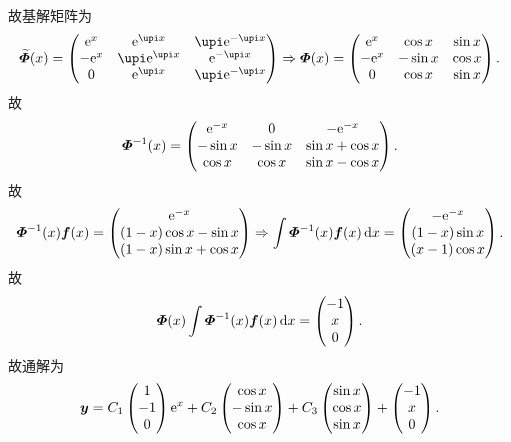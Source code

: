 \begin{solution}
  故基解矩阵为
  \[\widetilde{\bmitPhi}(x) = 
  \begin{pmatrix}
    \e^x&\e^{\upi x}&\upi\e^{-\upi x} \\
    -\e^x&\upi\e^{\upi x}&\e^{-\upi x} \\
    0&\e^{\upi x}&\upi\e^{-\upi x}
  \end{pmatrix}\Rightarrow
  \bmitPhi(x) =
  \begin{pmatrix}
    \e^x&\cos x&\sin x \\
    -\e^x&-\sin x&\cos x \\
    0&\cos x&\sin x
  \end{pmatrix}.\]
  故
  \[\bm{\varPhi}^{-1}(x) =
  \begin{pmatrix}
    \mathrm{e}^{-x}&0&-\mathrm{e}^{-x} \\
    -\sin x&-\sin x&\sin x+\cos x \\
    \cos x&\cos x&\sin x-\cos x
  \end{pmatrix}.\]
  故
  \[\bm{\varPhi}^{-1}(x)\bm{f}(x) =
  \begin{pmatrix}
    \mathrm{e}^{-x} \\
    (1-x)\cos x-\sin x \\
    (1-x)\sin x+\cos x
  \end{pmatrix}\Rightarrow
  \int\bm{\varPhi}^{-1}(x)\bm{f}(x)\mathop{}\!\mathrm{d} x =
  \begin{pmatrix}
    -\mathrm{e}^{-x} \\ 
    (1-x)\sin x \\
    (x-1)\cos x
  \end{pmatrix}.\]
  故
  \[\bm{\varPhi}(x)\int\bm{\varPhi}^{-1}(x)\bm{f}(x)\mathop{}\!\mathrm{d} x
    = \begin{pmatrix}-1\\x\\0\end{pmatrix}.\]
  故通解为
  \[\bm{y} = C_1\begin{pmatrix}1\\-1\\0\end{pmatrix}\mathrm{e}^x
    + C_2\begin{pmatrix}\cos x\\-\sin x\\\cos x\end{pmatrix}
    + C_3\begin{pmatrix}\sin x\\\cos x\\\sin x\end{pmatrix}
    + \begin{pmatrix}-1\\x\\0\end{pmatrix}.\]


\end{solution}
